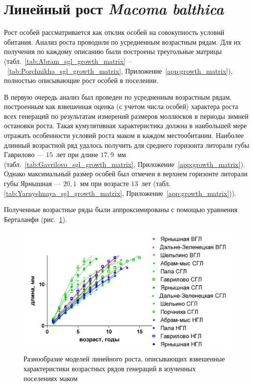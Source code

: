     \section{Линейный рост {\it Macoma balthica}}
Рост особей рассматривается как отклик особей на совокупность условий обитания. 
Анализ роста проводили по усредненным возрастным рядам. 
Для их получения по каждому описанию   были   построены   треугольные   матрицы   (табл.~\ref{tab:Abram_sgl_growth_matrix}~--~\ref{tab:Porchnikha_sgl_growth_matrix},   Приложение~\ref{app:growth_matrix}),   полностью описывающие рост особей в поселении.

В   первую   очередь   анализ   был   проведен   по  усредненным   возрастным   рядам, построенным как взвешенная оценка (с учетом числа особей) характера роста всех генераций по   результатам   измерений   размеров  моллюсков  в   периоды   зимней   остановки   роста.  
Такая кумулятивная   характеристика   должна   в   наибольшей   мере   отражать   особенности   условий роста маком в каждом местообитании.
Наиболее длинный возрастной ряд удалось получить для среднего горизонта литорали губы Гаврилово --- $15$~лет при длине $17,9$~мм (табл.~\ref{tab:Gavrilovo_sgl_growth_matrix},   Приложение~\ref{app:growth_matrix}). 
Однако максимальный размер особей был отмечен в верхнем горизонте литорали губы Ярнышная --- $20,1$~мм при возрасте $13$~лет (табл. \ref{tab:Yarnyshnaya_sgl_growth_matrix},   Приложение~\ref{app:growth_matrix})). 

Полученные   возрастные   ряды   были   аппроксимированы   с   помощью   уравнения Берталанфи   (рис.~\ref{ris:Barents_growth_gorizonts_all}).
    \begin{figure}
        \includegraphics[width=\textwidth]{../Barenc_Sea/growth_from_MSc/Rost_gorizonts_all.jpg}
    \caption{Разнообразие моделей линейного роста, описывающих взвешенные характеристики возрастных рядов генераций в изученных поселениях маком}
    \label{ris:Barents_growth_gorizonts_all}
    \end{figure}

